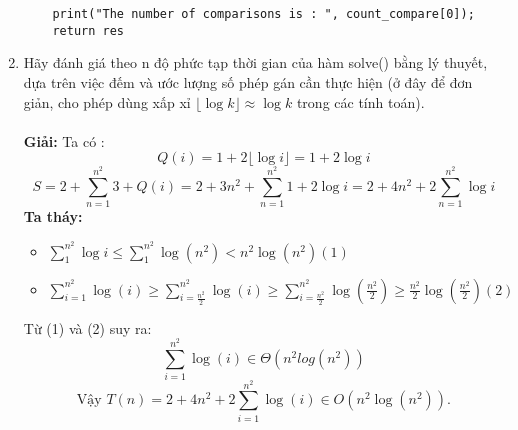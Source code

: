 \documentclass[12pt,a4paper]{article}
\begin{document}
\begin{enumerate}[label=\textbf{Câu 3.\arabic*},leftmargin=*]
\begin{lstlisting}
    print("The number of comparisons is : ", count_compare[0]);
    return res
\end{lstlisting}
    \item Hãy đánh giá theo n độ phức tạp thời gian của hàm solve() bằng lý thuyết, dựa
          trên việc đếm và ước lượng số phép gán cần thực hiện (ở đây để đơn giản, cho
          phép dùng xấp xỉ $\lfloor\log k\rfloor \approx \log k$ trong các tính toán).\\
          \\ \textbf{Giải: } Ta có :$$Q(i)=1+2\lfloor\log i\rfloor=1+2\log i $$
          $$S=2+\sum_{n = 1}^{n^2}3+Q(i) =2+3n^2+\sum_{n=1}^{n^2}1+2\log i=
              2+4n^2+2\sum_{n=1}^{n^2}\log i$$ \textbf{Ta tháy:}
          \begin{itemize}
              \item $\sum_{1}^{n^2} \log i \leq \sum_{1}^{n^2}\log(n^2)<n^2\log(n^2) (1)$
              \item $\sum_{i=1}^{n^2} \log(i) \geq \sum_{i=\frac{n^2}{2}}^{n^2}\log(i) \geq \sum_{i=\frac{n^2}{2}}^{n^2}\log(\frac{n^2}{2}) \geq \frac{n^2}{2}\log(\frac{n^2}{2}) (2)$
          \end{itemize}
          Từ (1) và (2) suy ra:  $$\sum_{i=1}^{n^2}\log(i) \in \Theta (n^2log(n^2)) $$
          $$\text{Vậy } T(n)=2+4n^2+2\sum_{i=1}^{n^2}\log(i)\in O(n^2\log(n^2)).$$
\end{enumerate}
\end{document}
